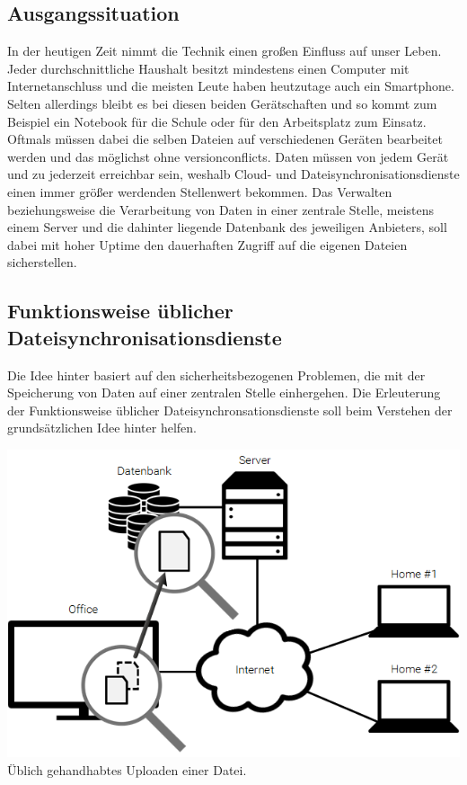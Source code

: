 \subsection{Ausgangssituation}
In der heutigen Zeit nimmt die Technik einen großen Einfluss auf unser Leben.
Jeder durchschnittliche Haushalt besitzt mindestens einen Computer mit
Internetanschluss und die meisten Leute haben heutzutage auch ein Smartphone.
Selten allerdings bleibt es bei diesen beiden Gerätschaften und so kommt zum Beispiel
ein Notebook für die Schule oder für den Arbeitsplatz zum Einsatz. Oftmals
müssen dabei die selben Dateien auf verschiedenen Geräten bearbeitet werden und
das möglichst ohne \glspl{versionconflict}. Daten müssen von jedem
Gerät und zu jederzeit erreichbar sein, weshalb Cloud- und
Dateisynchronisationsdienste einen immer größer werdenden Stellenwert bekommen.
Das Verwalten beziehungsweise die Verarbeitung von Daten in einer
zentrale Stelle, meistens einem Server und die dahinter liegende Datenbank des
jeweiligen Anbieters, soll dabei mit hoher Uptime den dauerhaften Zugriff auf
die eigenen Dateien sicherstellen.

\subsection{Funktionsweise üblicher Dateisynchronisationsdienste}
Die Idee hinter \sblit basiert auf den sicherheitsbezogenen Problemen, die mit
der Speicherung von Daten auf einer zentralen Stelle einhergehen. Die
Erleuterung der Funktionsweise üblicher Dateisynchronsationsdienste soll beim
Verstehen der grundsätzlichen Idee hinter \sblit helfen.

\includegraphics[]{images/Dropbox_1}
Üblich gehandhabtes Uploaden einer Datei.

